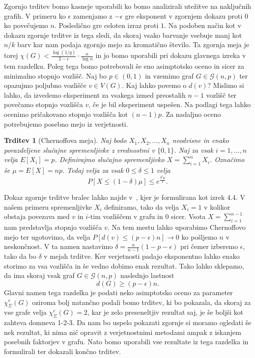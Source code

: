 \documentclass[12pt,a4paper,twoside]{article}
\theoremstyle{definition} %
\theoremstyle{plain} %
\newtheorem{trditev}[definicija]{Trditev}
\newcommand{\ec}{\chi_{\Sigma}^e}
\numberwithin{equation}{section}  %
\begin{document}
Zgornjo trditev bomo kasneje uporabili ko bomo analizirali utežitve na naključnih grafih. V primeru ko $\epsilon$ zamenjamo z $-\epsilon$ gre eksponent v zgornjem dokazu proti $0$ ko povečujemo $n$. Posledično gre celoten izraz proti $1$. Na podoben način kot v dokazu zgornje trditve iz tega sledi, da skoraj vsako barvanje vsebuje manj kot $n/k$ barv kar nam podaja zgornjo mejo za kromatično število. Ta zgornja meja je torej $\chi(G) < \frac{\log(1/q)}{2 - \epsilon} \cdot \frac{n}{\log n}$ in jo bomo uporabili pri dokazu glavnega izreka v tem razdelku. Poleg tega bomo potrebovali še eno asimptotsko oceno in sicer za minimalno stopnjo vozlišč. Naj bo $p \in (0, 1)$ in vzemimo graf $G \in  \mathcal{G}(n, p)$ ter opazujmo poljubno vozlišče $v \in V(G)$. Kaj lahko povemo o $d(v)$? Mislimo si lahko, da izvedemo eksperiment za vsakega izmed preostalih $n - 1$ vozlišč ter povečamo stopnjo vozlišča $v$, če je bil eksperiment uspešen. Na podlagi tega lahko ocenimo pričakovano stopnjo vozlišča kot $(n-1)p$. Za nadaljno oceno potrebujemo posebno mejo iz verjetnosti.
\begin{trditev}[Chernoffova meja]
Naj bodo $X_1, X_2, \ldots, X_n$ neodvisne in enako porazdeljene slučajne spremenljivke z vrednostmi v $\{0, 1\}$. Naj za vsak $i = 1, \ldots, n$ velja $E[X_i] = p$. Definirajmo slučajno spremenljivko $X = \sum_{i=1}^n X_i$. Označimo še $\mu = E[X] = np$. Tedaj velja za vsak $0 \le\delta \le 1$ velja
$$P[X \le (1-\delta) \mu] \le e ^{\frac{\delta^2 \mu}{2}}. $$
\end{trditev}
Dokaz zgornje trditve bralec lahko najde v~\cite{chernov}, kjer je formulirana kot izrek 4.4.
V našem primeru spremenljivke $X_i$ definiramo, tako da velja $X_i = 1$ v kolikor obstaja povezava med $v$ in $i$-tim vozliščem v grafu in $0$ sicer. Vsota $X = \sum_{i=1}^{n-1}$ nam predstavlja stopnjo vozlišča $v$. Na tem mestu lahko uporabimo Chernoffovo mejo ter ugotovimo, da velja $P[d(v) \le (p - \epsilon)n] \rightarrow 0$ ko pošljemo $n$ v neskončnost. V ta namen nastavimo $\delta = \frac{n}{n-1}(1-p-\epsilon)$ pri čemer izberemo $\epsilon$, tako da bo $\delta$ v mejah trditve. Ker verjetnosti padajo eksponentno lahko enako storimo za vsa vozlišča in še vedno dobimo enak rezultat. Tako lahko sklepamo, da ima skoraj vsak graf $G \in  \mathcal{G}(n, p)$ naslednjo lastnost
$$ d(G) \ge (p - \epsilon)n .$$
Glavni namen tega razdelka je podati neko asimptotsko oceno za parameter $\ec(G)$ oziroma bolj natančno podali bomo trditev, ki bo pokazala, da skoraj za vse grafe velja $\ec(G) = 2$, kar je zelo preseneltjiv rezultat saj, je še boljši kot zahteva domneva 1-2-3. Da nam bo uspelo pokazati zgornje si moramo ogledati še nek rezultat, ki nima nič opravit z verjetnostnimi metodami ampak z iskanjem posebnih faktorjev v grafu. Nato bomo uporabili vse rezultate iz tega razdelka in formulirali ter dokazali končno trditev.
\end{document}
